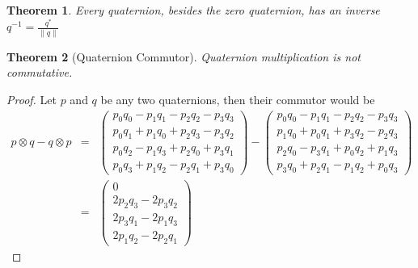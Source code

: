 \documentclass{amsart}
\newtheorem{theorem}{Theorem}[section]
\theoremstyle{definition}
\theoremstyle{remark}
\numberwithin{equation}{section}
\begin{document}
\begin{theorem}
  Every quaternion, besides the zero quaternion, has an inverse $q^{-1}=\frac{q^*}{\|q\|}$
\end{theorem}

\begin{theorem}[Quaternion Commutor]
  Quaternion multiplication is not commutative.
\end{theorem}
\begin{proof}
  Let $p$ and $q$ be any two quaternions, then their commutor would be
  \begin{eqnarray}
    p\otimes q-q\otimes p &=&
    \begin{pmatrix}
      p_0q_0 - p_1q_1 - p_2q_2 - p_3q_3 \\
      p_0q_1 + p_1q_0 + p_2q_3 - p_3q_2 \\
      p_0q_2 - p_1q_3 + p_2q_0 + p_3q_1 \\
      p_0q_3 + p_1q_2 - p_2q_1 + p_3q_0
    \end{pmatrix} -
    \begin{pmatrix}
      p_0q_0 - p_1q_1 - p_2q_2 - p_3q_3 \\
      p_1q_0 + p_0q_1 + p_3q_2 - p_2q_3 \\
      p_2q_0 - p_3q_1 + p_0q_2 + p_1q_3 \\
      p_3q_0 + p_2q_1 - p_1q_2 + p_0q_3
    \end{pmatrix}\nonumber\\
    &=&
    \begin{pmatrix}
      0 \\
      2p_2q_3-2p_3q_2\\
      2p_3q_1-2p_1q_3\\
      2p_1q_2-2p_2q_1
    \end{pmatrix}
  \end{eqnarray}
\end{proof}
\end{document}
